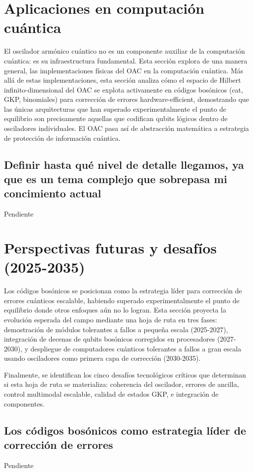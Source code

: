 \documentclass[11pt,a4paper,spanish]{book}
\begin{document}
\section{Aplicaciones en computación cuántica}

El oscilador armónico cuántico no es un componente auxiliar de la computación cuántica: es su infraestructura fundamental. Esta sección explora de una manera general, las implementaciones físicas del OAC en la computación cuántica. Más allá de estas implementaciones, esta sección analiza cómo el espacio de Hilbert infinito-dimensional del OAC se explota activamente en códigos bosónicos (cat, GKP, binomiales) para corrección de errores hardware-efficient, demostrando que las únicas arquitecturas que han superado experimentalmente el punto de equilibrio son precisamente aquellas que codifican qubits lógicos dentro de osciladores individuales. El OAC pasa así de abstracción matemática a estrategia de protección de información cuántica.


\subsection*{Definir hasta qué nivel de detalle llegamos, ya que es un tema complejo que sobrepasa mi concimiento actual}
Pendiente

\section{Perspectivas futuras y desafíos (2025-2035)}
Los códigos bosónicos se posicionan como la estrategia líder para corrección de errores cuánticos escalable, habiendo superado experimentalmente el punto de equilibrio donde otros enfoques aún no lo logran. Esta sección proyecta la evolución esperada del campo mediante una hoja de ruta en tres fases: demostración de módulos tolerantes a fallos a pequeña escala (2025-2027), integración de decenas de qubits bosónicos corregidos en procesadores (2027-2030), y despliegue de computadores cuánticos tolerantes a fallos a gran escala usando osciladores como primera capa de corrección (2030-2035). 

Finalmente, se identifican los cinco desafíos tecnológicos críticos que determinan si esta hoja de ruta se materializa: coherencia del oscilador, errores de ancilla, control multimodal escalable, calidad de estados GKP, e integración de componentes.

\subsection*{Los códigos bosónicos como estrategia líder de corrección de errores}
Pendiente
\end{document}
